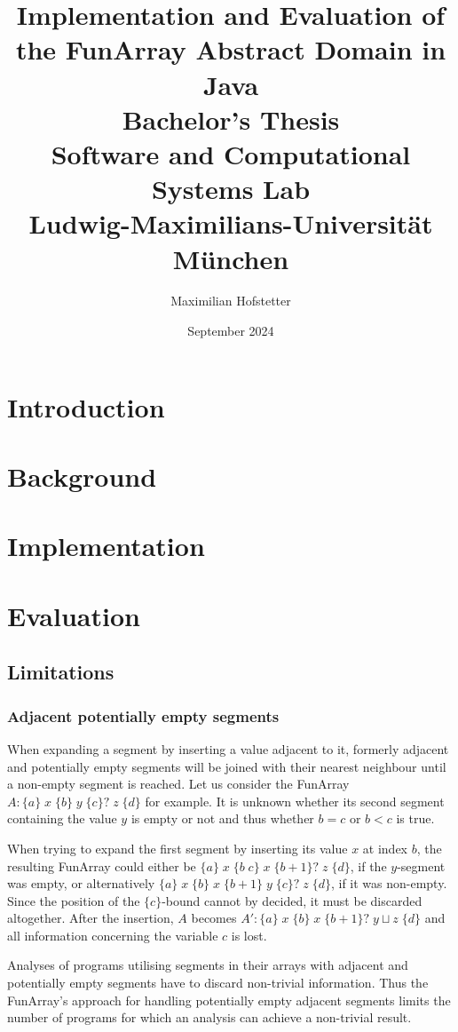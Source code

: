 \documentclass{report}
\title{Implementation and Evaluation of the FunArray Abstract Domain in Java\\[1em]\large{}Bachelor's Thesis\\[1em]Software and Computational Systems Lab\\Ludwig-Maximilians-Universit\"at M\"unchen}
\date{September 2024}
\author{Maximilian Hofstetter}
\newcommand{\funArray}[1]{$#1$}
\newcommand{\bound}[1]{\{#1\}}
\newcommand{\fvalue}[1]{\;#1\;}
\begin{document}
\maketitle

\chapter{Introduction}
\chapter{Background}
\chapter{Implementation}
\chapter{Evaluation}
\section{Limitations}
\subsection{Adjacent potentially empty segments}
When expanding a segment by inserting a value adjacent to it, formerly adjacent and potentially empty segments will be joined with their nearest neighbour until a non-empty segment is reached. Let us consider the FunArray \funArray{A:\bound{a} \fvalue{x} \bound{b} \fvalue{y} \bound{c}? \fvalue{z} \bound{d}} for example. It is unknown whether its second segment containing the value $y$ is empty or not and thus whether $b=c$ or $b<c$ is true.

When trying to expand the first segment by inserting its value $x$ at index $b$, the resulting FunArray could either be \funArray{\bound{a} \fvalue{x} \bound{b\;c} \fvalue{x} \bound{b+1}? \fvalue{z} \bound{d}}, if the $y$-segment was empty, or alternatively \funArray{\bound{a} \fvalue{x} \bound{b} \fvalue{x} \bound{b+1} \fvalue{y} \bound{c}? \fvalue{z} \bound{d}}, if it was non-empty. Since the position of the \funArray{\bound{c}}-bound cannot by decided, it must be discarded altogether. After the insertion, $A$ becomes \funArray{A':\bound{a} \fvalue{x} \bound{b} \fvalue{x} \bound{b+1}? \fvalue{y\sqcup z} \bound{d}} and all information concerning the variable $c$ is lost.

 Analyses of programs utilising segments in their arrays with adjacent and potentially empty segments have to discard non-trivial information. Thus the FunArray's approach for handling potentially empty adjacent segments limits the number of programs for which an analysis can achieve a non-trivial result.
 
\end{document}
